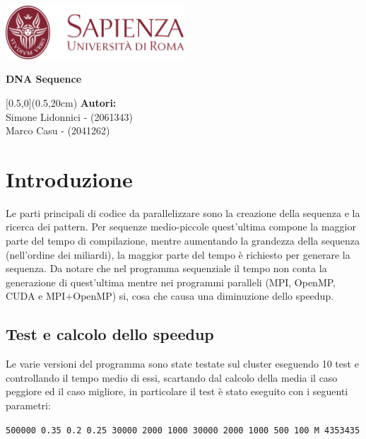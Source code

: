 \documentclass[12pt,openany]{report}
\date{\today}
\makeatletter
\def\tit{DNA Sequence}
\let\datename\@date
\def\authorname{Simone Lidonnici - (2061343)\\Marco Casu - (2041262)}
\makeatother
\begin{document}
\begin{titlepage}
    \begin{center}
        \includegraphics[width=0.5\textwidth]{images/Sapienza_logo.png}
    \end{center}
    \centering\Large \textbf{\color{Sapienza}{Facoltà di Ingegneria dell'Informazione, Informatica e Statistica\\Dipartimento di Informatica}}
    \vspace{4cm}
    \begin{tcolorbox}[enhanced, width=\textwidth, colframe=Sapienza, colback=white, halign=flush center, sharp corners=all, boxrule=1mm, bottom=5mm, top=5mm]
        \Huge\textbf{\tit}
    \end{tcolorbox}
    \begin{textblock*}{\textwidth}[0.5,0](0.5\pdfpagewidth,20cm)
        \centering\large\textbf{Autori:}\\\authorname
    \end{textblock*}
    \vfill
    \centering\large\datename
\end{titlepage}

\section{Introduzione}
Le parti principali di codice da parallelizzare sono la creazione della sequenza e la ricerca dei pattern. Per sequenze medio-piccole quest'ultima compone la maggior parte del tempo di compilazione, mentre aumentando la grandezza della sequenza (nell'ordine dei miliardi), la maggior parte del tempo è richiesto per generare la sequenza. Da notare che nel programma sequenziale il tempo non conta la generazione di quest'ultima mentre nei programmi paralleli (MPI, OpenMP, CUDA e MPI+OpenMP) si, cosa che causa una diminuzione dello speedup.
\subsection{Test e calcolo dello speedup}
Le varie versioni del programma sono state testate sul cluster eseguendo 10 test e controllando il tempo medio di essi, scartando dal calcolo della media il caso peggiore ed il caso migliore, in particolare il test è stato eseguito con i seguenti parametri:
\begin{center}
    \texttt{500000 0.35 0.2 0.25 30000 2000 1000 30000 2000 1000 500 100 M 4353435}
\end{center}
\end{document}
